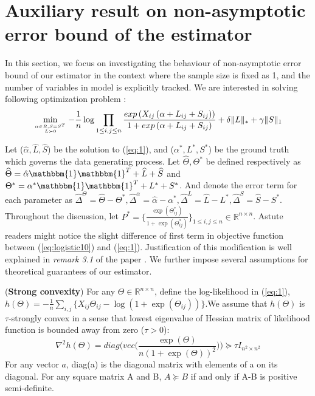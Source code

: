 \documentclass[AMS,STIX1COL]{WileyNJD-v2}
\begin{document}
\section{Auxiliary result on non-asymptotic error bound of the estimator}
In this section, we focus on investigating the behaviour of non-asymptotic error bound of our estimator in the context where the sample size is fixed as 1, and the number of variables in model is explicitly tracked. We are interested in solving following optimization problem :
\begin{equation}\label{eq:1}
\min\limits_{\alpha \in R, S = S^T \atop L \succ 0}   
-\frac{1}{n} \log \prod_{1\le i,j\le n}\frac{exp\left(X_{ij}\left(\alpha+
L_{ij}+S_{ij}\right)\right)}{1+exp\left(\alpha+
L_{ij}+S_{ij}\right)} + \delta \|L\|_\ast + \gamma \|S\|_1
\end{equation}

Let ($\hat{\alpha},\widehat{L},\widehat{S}$) be the solution to (\ref{eq:1}), and ($\alpha^{*},L^{*},S^{*}$) be the ground truth which governs the data generating process.
Let $\widehat{\Theta},\Theta^{*}$ be defined respectively as $\widehat{\Theta} = \hat{\alpha}\mathbbm{1}\mathbbm{1}^T+\widehat{L}+\widehat{S}$ and $\Theta^{*} = \alpha^{*}\mathbbm{1}\mathbbm{1}^T+L^{*}+S^{*}$.
And denote the error term for each parameter as $\widehat{\Delta}^{\Theta} = \widehat{\Theta}-\Theta^{*}, 
\hat{\Delta}^{\alpha} = \hat{\alpha}-\alpha^{*},
\widehat{\Delta}^L = \widehat{L}-L^{*},
\widehat{\Delta}^S = \widehat{S}-S^{*}.$
Throughout the discussion, let $P^{*}=\big\{\frac{\exp(\Theta_{ij}^{*})}{1+\exp(\Theta_{ij}^{*})}\big\}_{1 \leq i,j \leq n} \in \mathbb{R}^{n \times n}$.
Astute readers might notice the slight difference of first term in objective function between (\ref{eq:logistic10})
and (\ref{eq:1}). 
Justification of this modification is well explained in \emph{remark 3.1} of the paper \cite{ma2017exploration}. 
We further impose several assumptions for theoretical guarantees of our estimator.

\begin{assumption}(\textbf{Strong convexity})  \label{Ass:1}
For any $\Theta \in \mathbb{R}^{n\times n}$, define the log-likelihood in (\ref{eq:1}), $h(\Theta) = -\frac{1}{n}\sum_{i,j} \big\{ X_{ij}\Theta_{ij} - \log(1+\exp(\Theta_{ij})) \big\}$.We assume that $h(\Theta)$ is $\tau$-strongly convex in a sense that lowest eigenvalue of Hessian matrix of likelihood function is bounded away from zero ($\tau > 0$):
\[
\nabla^{2}h(\Theta) = diag\Big(vec\Big(\frac{\exp(\Theta)}{n(1+\exp(\Theta))^{2}}
\Big)\Big) \succcurlyeq \tau I_{n^{2} \times n^{2}}
\]
For any vector $a$, diag(a) is the diagonal matrix with elements of a on its diagonal. For any square matrix A and B, $ A \succcurlyeq B $ if and only if A-B is positive semi-definite.
\end{assumption}
\end{document}

